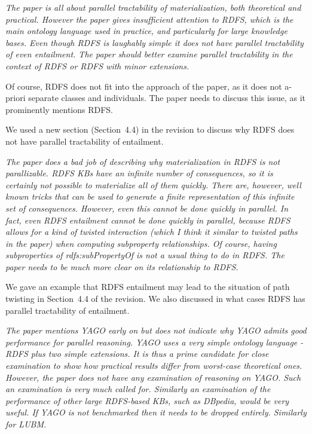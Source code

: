 \documentclass{article}
\let\quoteOld\quote
\let\endquoteOld\endquote
\renewenvironment{quote}{\quoteOld\itshape}{\endquoteOld}
\begin{document}
\begin{quote}
The paper is all about parallel tractability of materialization, both
theoretical and practical.  However the paper gives insufficient attention
to RDFS, which is the main ontology language used in practice, and
particularly for large knowledge bases.  Even though RDFS is laughably
simple it does not have parallel tractability of even entailment.  The paper
should better examine parallel tractability in the context of RDFS or RDFS
with minor extensions.

Of course, RDFS does not fit into the approach of the paper, as it does not
a-priori separate classes and individuals.  The paper needs to discuss this
issue, as it prominently mentions RDFS.
\end{quote}

We used a new section (Section~4.4) in the revision to discuss why RDFS
does not have parallel tractability of entailment.

\begin{quote}
The paper does a bad job of describing why materialization in RDFS is not
parallizable.  RDFS KBs have an infinite number of consequences, so it is
certainly not possible to materialize all of them quickly.  There are,
however, well known tricks that can be used to generate a finite
representation of this infinite set of consequences.  However, even this
cannot be done quickly in parallel.  In fact, even RDFS entailment cannot be
done quickly in parallel, because RDFS allows for a kind of twisted
interaction (which I think it similar to twisted paths in the paper) when
computing subproperty relationships.  Of course, having subproperties of
rdfs:subPropertyOf is not a usual thing to do in RDFS.  The paper needs to
be much more clear on its relationship to RDFS.
\end{quote}

We gave an example that RDFS entailment may lead to the situation of path twisting in Section~4.4 of the revision.
We also discussed in what cases RDFS has parallel tractability of entailment.

\begin{quote}
The paper mentions YAGO early on but does not indicate why YAGO admits good
performance for parallel reasoning.  YAGO uses a very simple ontology
language - RDFS plus two simple extensions.  It is thus a prime candidate
for close examination to show how practical results differ from worst-case
theoretical ones.  However, the paper does not have any examination of
reasoning on YAGO.  Such an examination is very much called for.  Similarly
an examination of the performance of other large RDFS-based KBs, such as
DBpedia, would be very useful.   If YAGO is not benchmarked then it needs to
be dropped entirely.   Similarly for LUBM.
\end{quote}
\end{document}
